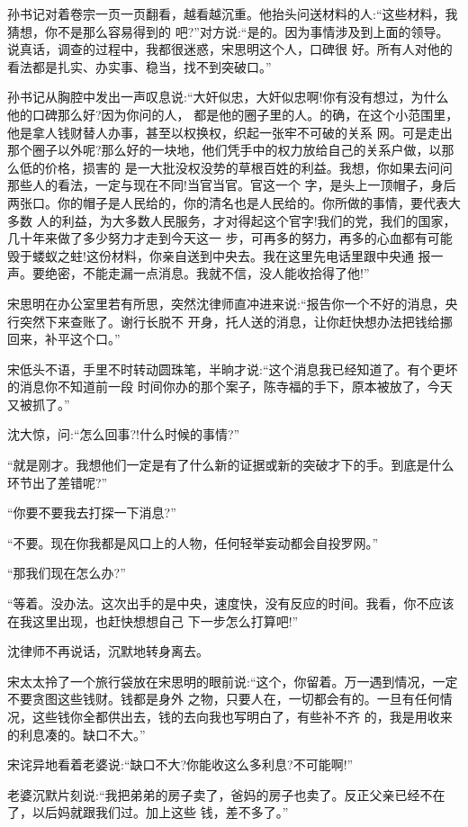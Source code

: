 \documentclass[11pt,a4paper,onecolumn]{article}
\begin{document}
孙书记对着卷宗一页一页翻看，越看越沉重。他抬头问送材料的人:``这些材料，我猜想，你不是那么容易得到的
吧?''对方说:``是的。因为事情涉及到上面的领导。说真话，调查的过程中，我都很迷惑，宋思明这个人，口碑很
好。所有人对他的看法都是扎实、办实事、稳当，找不到突破口。''

孙书记从胸腔中发出一声叹息说:``大奸似忠，大奸似忠啊!你有没有想过，为什么他的口碑那么好?因为你问的人，
都是他的圈子里的人。的确，在这个小范围里，他是拿人钱财替人办事，甚至以权换权，织起一张牢不可破的关系
网。可是走出那个圈子以外呢?那么好的一块地，他们凭手中的权力放给自己的关系户做，以那么低的价格，损害的
是一大批没权没势的草根百姓的利益。我想，你如果去问问那些人的看法，一定与现在不同!当官当官。官这一个
字，是头上一顶帽子，身后两张口。你的帽子是人民给的，你的清名也是人民给的。你所做的事情，要代表大多数
人的利益，为大多数人民服务，才对得起这个官字!我们的党，我们的国家，几十年来做了多少努力才走到今天这一
步，可再多的努力，再多的心血都有可能毁于蝼蚁之蛀!这份材料，你亲自送到中央去。我在这里先电话里跟中央通
报一声。要绝密，不能走漏一点消息。我就不信，没人能收拾得了他!''

宋思明在办公室里若有所思，突然沈律师直冲进来说:``报告你一个不好的消息，央行突然下来查账了。谢行长脱不
开身，托人送的消息，让你赶快想办法把钱给挪回来，补平这个口。''

宋低头不语，手里不时转动圆珠笔，半晌才说:``这个消息我已经知道了。有个更坏的消息你不知道\myrule 前一段
时间你办的那个案子，陈寺福的手下，原本被放了，今天又被抓了。''

沈大惊，问:``怎么回事?!什么时候的事情?''

``就是刚才。我想他们一定是有了什么新的证据或新的突破才下的手。到底是什么环节出了差错呢?''

``你要不要我去打探一下消息?''

``不要。现在你我都是风口上的人物，任何轻举妄动都会自投罗网。''

``那我们现在怎么办?''

``等着。没办法。这次出手的是中央，速度快，没有反应的时间。我看，你不应该在我这里出现，也赶快想想自己
下一步怎么打算吧!''

沈律师不再说话，沉默地转身离去。

宋太太拎了一个旅行袋放在宋思明的眼前说:``这个，你留着。万一遇到情况，一定不要贪图这些钱财。钱都是身外
之物，只要人在，一切都会有的。一旦有任何情况，这些钱你全都供出去，钱的去向我也写明白了，有些补不齐
的，我是用收来的利息凑的。缺口不大。''

宋诧异地看着老婆说:``缺口不大?你能收这么多利息?不可能啊!''

老婆沉默片刻说:``我把弟弟的房子卖了，爸妈的房子也卖了。反正父亲已经不在了，以后妈就跟我们过。加上这些
钱，差不多了。''
\end{document}
